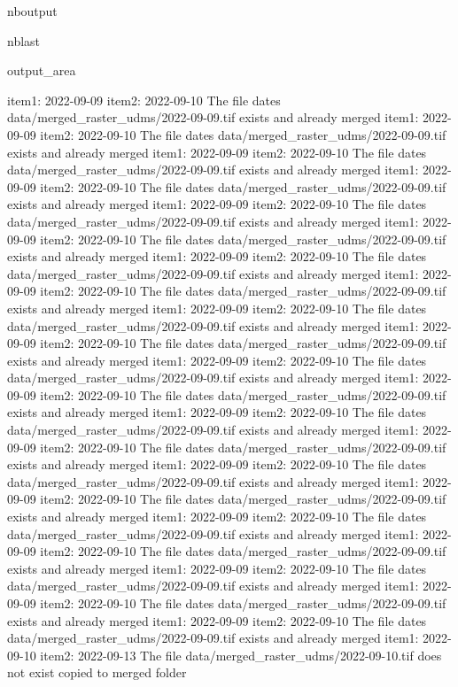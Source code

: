 \documentclass[letterpaper,10pt]{sphinxmanual}
\begin{document}
\begin{sphinxuseclass}{nboutput}
\begin{sphinxuseclass}{nblast}
{\begin{sphinxuseclass}{output_area}
\begin{sphinxuseclass}{}
\begin{sphinxVerbatim}[commandchars=\\\{\}]
item1:  2022-09-09
item2:  2022-09-10
The file dates data/merged\_raster\_udms/2022-09-09.tif exists and already merged
item1:  2022-09-09
item2:  2022-09-10
The file dates data/merged\_raster\_udms/2022-09-09.tif exists and already merged
item1:  2022-09-09
item2:  2022-09-10
The file dates data/merged\_raster\_udms/2022-09-09.tif exists and already merged
item1:  2022-09-09
item2:  2022-09-10
The file dates data/merged\_raster\_udms/2022-09-09.tif exists and already merged
item1:  2022-09-09
item2:  2022-09-10
The file dates data/merged\_raster\_udms/2022-09-09.tif exists and already merged
item1:  2022-09-09
item2:  2022-09-10
The file dates data/merged\_raster\_udms/2022-09-09.tif exists and already merged
item1:  2022-09-09
item2:  2022-09-10
The file dates data/merged\_raster\_udms/2022-09-09.tif exists and already merged
item1:  2022-09-09
item2:  2022-09-10
The file dates data/merged\_raster\_udms/2022-09-09.tif exists and already merged
item1:  2022-09-09
item2:  2022-09-10
The file dates data/merged\_raster\_udms/2022-09-09.tif exists and already merged
item1:  2022-09-09
item2:  2022-09-10
The file dates data/merged\_raster\_udms/2022-09-09.tif exists and already merged
item1:  2022-09-09
item2:  2022-09-10
The file dates data/merged\_raster\_udms/2022-09-09.tif exists and already merged
item1:  2022-09-09
item2:  2022-09-10
The file dates data/merged\_raster\_udms/2022-09-09.tif exists and already merged
item1:  2022-09-09
item2:  2022-09-10
The file dates data/merged\_raster\_udms/2022-09-09.tif exists and already merged
item1:  2022-09-09
item2:  2022-09-10
The file dates data/merged\_raster\_udms/2022-09-09.tif exists and already merged
item1:  2022-09-09
item2:  2022-09-10
The file dates data/merged\_raster\_udms/2022-09-09.tif exists and already merged
item1:  2022-09-09
item2:  2022-09-10
The file dates data/merged\_raster\_udms/2022-09-09.tif exists and already merged
item1:  2022-09-09
item2:  2022-09-10
The file dates data/merged\_raster\_udms/2022-09-09.tif exists and already merged
item1:  2022-09-09
item2:  2022-09-10
The file dates data/merged\_raster\_udms/2022-09-09.tif exists and already merged
item1:  2022-09-09
item2:  2022-09-10
The file dates data/merged\_raster\_udms/2022-09-09.tif exists and already merged
item1:  2022-09-09
item2:  2022-09-10
The file dates data/merged\_raster\_udms/2022-09-09.tif exists and already merged
item1:  2022-09-09
item2:  2022-09-10
The file dates data/merged\_raster\_udms/2022-09-09.tif exists and already merged
item1:  2022-09-10
item2:  2022-09-13
The file data/merged\_raster\_udms/2022-09-10.tif does not exist copied to merged folder

\end{sphinxVerbatim}
\end{sphinxuseclass}
\end{sphinxuseclass}}
\end{sphinxuseclass}
\end{sphinxuseclass}
\end{document}
